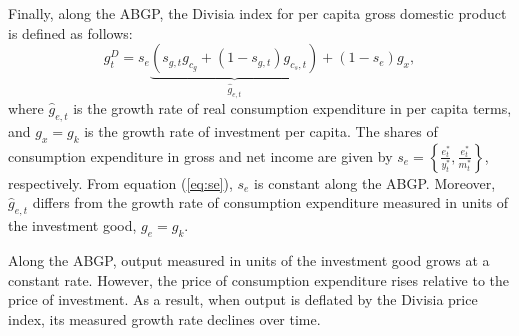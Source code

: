 \documentclass[12pt,a4paper]{article}
\newcommand{\red}[1]{\textcolor{red}{#1}} %
\begin{document}


Finally, along the ABGP, the Divisia index for per capita gross domestic product is defined as follows:
\begin{equation}\label{eq:Divisia}
g^D_t = s_e \underbrace{\left( s_{g,t} g_{c_g} + (1 - s_{g,t}) g_{c_s,t} \right)}_{\widehat g_{e,t}} + (1 - s_e) g_x ,
\end{equation}
where \(\widehat{g}_{e,t}\) is the growth rate of real consumption expenditure in per capita terms, and \(g_x = g_k\) is the growth rate of investment per capita.  
The shares of consumption expenditure in gross and net income are given by \(s_e = \left\{ \frac{e_t^*}{y_t^*}, \frac{e_t^*}{m_t^*} \right\}\), respectively.
From equation (\ref{eq:se}), $s_e$ is constant along the ABGP. Moreover, \( \widehat{g}_{e,t} \) differs from the growth rate of consumption expenditure measured in units of the investment good, \( g_e = g_k \).


  

Along the ABGP, output measured in units of the investment good grows at a constant rate. 
However, the price of consumption expenditure rises relative to the price of investment. 
As a result, when output is deflated by the Divisia price index, its measured growth rate declines over time.
\end{document}
